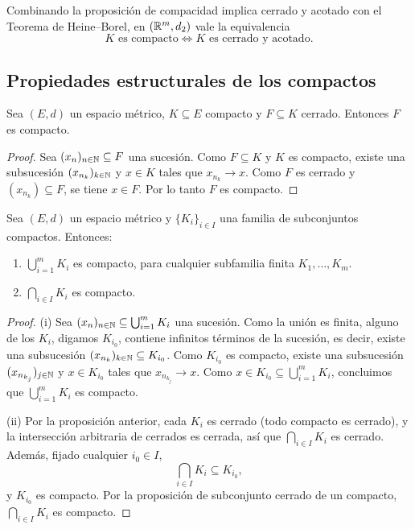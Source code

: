 \begin{obs}
Combinando la proposición de compacidad implica cerrado y acotado con el
Teorema de Heine--Borel, en $(\mathbb{R}^m,d_2)$ vale la equivalencia
\[
K \text{ es compacto} \iff K \text{ es cerrado y acotado}.
\]
\end{obs}

\subsection{Propiedades estructurales de los compactos}

\begin{prop}
Sea $(E,d)$ un espacio métrico, $K \subseteq E$ compacto y $F \subseteq K$
cerrado. Entonces $F$ es compacto.
\end{prop}

\begin{proof}
Sea $(x_n)_{n\in\mathbb{N}} \subseteq F$ una sucesión. Como $F\subseteq K$ y $K$
es compacto, existe una subsucesión $(x_{n_k})_{k\in\mathbb{N}}$ y $x\in K$ tales
que $x_{n_k}\to x$. Como $F$ es cerrado y $(x_{n_k})\subseteq F$, se
tiene $x\in F$. Por lo tanto $F$ es compacto.
\end{proof}

\begin{prop}
Sea $(E,d)$ un espacio métrico y $\{K_i\}_{i\in I}$ una familia de
subconjuntos compactos. Entonces:
\begin{enumerate}[label=(\roman*)]
    \item $\displaystyle\bigcup_{i=1}^m K_i$ es compacto, para cualquier
    subfamilia finita $K_1,\dots,K_m$.
    \item $\displaystyle\bigcap_{i\in I} K_i$ es compacto.
\end{enumerate}
\end{prop}

\begin{proof}
(i) Sea $(x_n)_{n\in\mathbb{N}} \subseteq \bigcup_{i=1}^m K_i$ una sucesión. Como
la unión es finita, alguno de los $K_i$, digamos $K_{i_0}$, contiene
infinitos términos de la sucesión, es decir, existe una subsucesión
$(x_{n_k})_{k\in\mathbb{N}} \subseteq K_{i_0}$. Como $K_{i_0}$ es compacto, existe
una subsucesión $(x_{n_{k_j}})_{j\in\mathbb{N}}$ y $x\in K_{i_0}$ tales que
$x_{n_{k_j}}\to x$. Como $x\in K_{i_0}\subseteq \bigcup_{i=1}^m K_i$,
concluimos que $\bigcup_{i=1}^m K_i$ es compacto.

(ii) Por la proposición anterior, cada $K_i$ es cerrado (todo compacto es
cerrado), y la intersección arbitraria de cerrados es cerrada, así que
$\bigcap_{i\in I} K_i$ es cerrado. Además, fijado cualquier $i_0\in I$,
\[
\bigcap_{i\in I} K_i \subseteq K_{i_0},
\]
y $K_{i_0}$ es compacto. Por la proposición de subconjunto cerrado de un
compacto, $\bigcap_{i\in I} K_i$ es compacto.
\end{proof}

